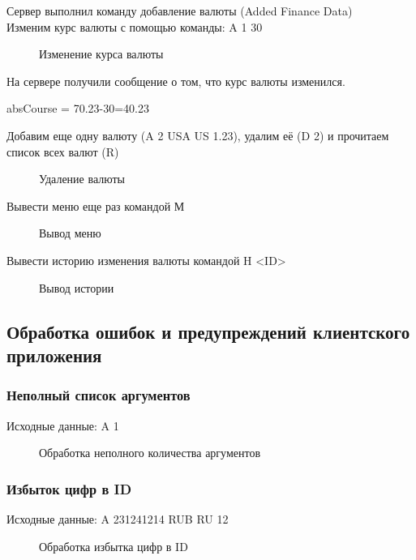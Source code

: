 \documentclass[a4paper,14pt]{article}
\begin{document}
Сервер выполнил команду добавление валюты (Added Finance Data)\\

Изменим курс валюты с помощью команды: A 1 30
\begin{figure}[h!]
	\noindent\centering{
		\texttt{[image: 6]}}
	\caption{Изменение курса валюты}
	\label{figCurves}
\end{figure}

На сервере получили сообщение о том, что курс валюты изменился. 

absCourse = 70.23-30=40.23

Добавим еще одну валюту (A 2 USA US 1.23), удалим её (D 2) и прочитаем список всех валют (R)
\begin{figure}[h!]
	\noindent\centering{
		\texttt{[image: 7]}}
	\caption{Удаление валюты}
	\label{figCurves}
\end{figure}
\newpage

Вывести меню еще раз командой М

\begin{figure}[h!]
	\noindent\centering{
		\texttt{[image: 8]}}
	\caption{Вывод меню}
	\label{figCurves}
\end{figure}

Вывести историю изменения валюты командой H <ID>

\begin{figure}[h!]
	\noindent\centering{
		\texttt{[image: 9]}}
	\caption{Вывод истории}
	\label{figCurves}
\end{figure}

\subsection {Обработка ошибок и предупреждений клиентского приложения}

\subsubsection {Неполный список аргументов}
Исходные данные: A 1

\begin{figure}[h!]
	\noindent\centering{
		\texttt{[image: 15]}}
	\caption{Обработка неполного количества аргументов}
	\label{figCurves}
\end{figure}

\subsubsection {Избыток цифр в ID}
Исходные данные: A 231241214 RUB RU 12
\begin{figure}[h!]
	\noindent\centering{
		\texttt{[image: 16]}}
	\caption{Обработка избытка цифр в ID}
	\label{figCurves}
\end{figure}
\end{document}
